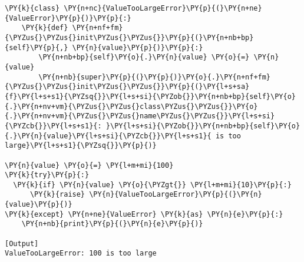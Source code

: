 \begin{Verbatim}[label=\makebox{\url{https://github.com/lucabaldini/cmepda/tree/master/slides/latex/snippets/custom\_exceptions\_2.py}},commandchars=\\\{\}]
\PY{k}{class} \PY{n+nc}{ValueTooLargeError}\PY{p}{(}\PY{n+ne}{ValueError}\PY{p}{)}\PY{p}{:}
    \PY{k}{def} \PY{n+nf+fm}{\PYZus{}\PYZus{}init\PYZus{}\PYZus{}}\PY{p}{(}\PY{n+nb+bp}{self}\PY{p}{,} \PY{n}{value}\PY{p}{)}\PY{p}{:}
        \PY{n+nb+bp}{self}\PY{o}{.}\PY{n}{value} \PY{o}{=} \PY{n}{value}
        \PY{n+nb}{super}\PY{p}{(}\PY{p}{)}\PY{o}{.}\PY{n+nf+fm}{\PYZus{}\PYZus{}init\PYZus{}\PYZus{}}\PY{p}{(}\PY{l+s+sa}{f}\PY{l+s+s1}{\PYZsq{}}\PY{l+s+si}{\PYZob{}}\PY{n+nb+bp}{self}\PY{o}{.}\PY{n+nv+vm}{\PYZus{}\PYZus{}class\PYZus{}\PYZus{}}\PY{o}{.}\PY{n+nv+vm}{\PYZus{}\PYZus{}name\PYZus{}\PYZus{}}\PY{l+s+si}{\PYZcb{}}\PY{l+s+s1}{: }\PY{l+s+si}{\PYZob{}}\PY{n+nb+bp}{self}\PY{o}{.}\PY{n}{value}\PY{l+s+si}{\PYZcb{}}\PY{l+s+s1}{ is too large}\PY{l+s+s1}{\PYZsq{}}\PY{p}{)}

\PY{n}{value} \PY{o}{=} \PY{l+m+mi}{100}
\PY{k}{try}\PY{p}{:}
  \PY{k}{if} \PY{n}{value} \PY{o}{\PYZgt{}} \PY{l+m+mi}{10}\PY{p}{:}
      \PY{k}{raise} \PY{n}{ValueTooLargeError}\PY{p}{(}\PY{n}{value}\PY{p}{)}
\PY{k}{except} \PY{n+ne}{ValueError} \PY{k}{as} \PY{n}{e}\PY{p}{:}
    \PY{n+nb}{print}\PY{p}{(}\PY{n}{e}\PY{p}{)}

[Output]
ValueTooLargeError: 100 is too large
\end{Verbatim}